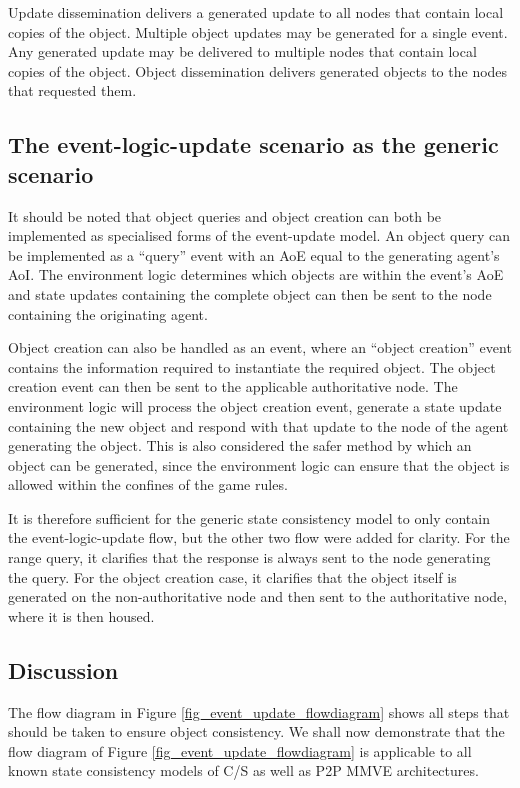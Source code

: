 Update dissemination delivers a generated update to all nodes that contain local copies of the object. Multiple object updates may be generated for a single event. Any generated update may be delivered to multiple nodes that contain local copies of the object. Object dissemination delivers generated objects to the nodes that requested them.

\subsection{The event-logic-update scenario as the generic scenario}

It should be noted that object queries and object creation can both be implemented as specialised forms of the event-update model. An object query can be implemented as a ``query'' event with an AoE equal to the generating agent's AoI. The environment logic determines which objects are within the event's AoE and state updates containing the complete object can then be sent to the node containing the originating agent.

Object creation can also be handled as an event, where an ``object creation'' event contains the information required to instantiate the required object. The object creation event can then be sent to the applicable authoritative node. The environment logic will process the object creation event, generate a state update containing the new object and respond with that update to the node of the agent generating the object. This is also considered the safer method by which an object can be generated, since the environment logic can ensure that the object is allowed within the confines of the game rules.

It is therefore sufficient for the generic state consistency model to only contain the event-logic-update flow, but the other two flow were added for clarity. For the range query, it clarifies that the response is always sent to the node generating the query. For the object creation case, it clarifies that the object itself is generated on the non-authoritative node and then sent to the authoritative node, where it is then housed.

\subsection{Discussion}

The flow diagram in Figure \ref{fig_event_update_flowdiagram} shows all steps that should be taken to ensure object consistency. We shall now demonstrate that the flow diagram of Figure \ref{fig_event_update_flowdiagram} is applicable to all known state consistency models of C/S as well as P2P MMVE architectures.

